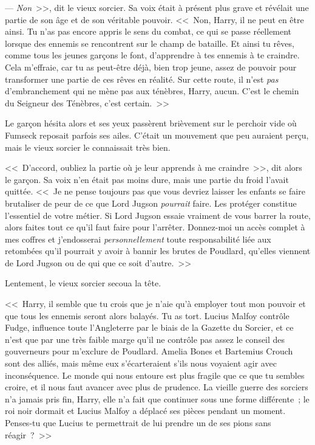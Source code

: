 --- \emph{Non}~>>, dit le vieux sorcier. Sa voix était à présent plus grave et révélait une partie de son âge et de son véritable pouvoir. <<~Non, Harry, il ne peut en être ainsi. Tu n'as pas encore appris le sens du combat, ce qui se passe réellement lorsque des ennemis se rencontrent sur le champ de bataille. Et ainsi tu rêves, comme tous les jeunes garçons le font, d'apprendre à tes ennemis à te craindre. Cela m'effraie, car tu as peut-être déjà, bien trop jeune, assez de pouvoir pour transformer une partie de ces rêves en réalité. Sur cette route, il n'est \emph{pas} d'embranchement qui ne mène pas aux ténèbres, Harry, aucun. C'est le chemin du Seigneur des Ténèbres, c'est certain.~>>

Le garçon hésita alors et ses yeux passèrent brièvement sur le perchoir vide où Fumseck reposait parfois ses ailes. C'était un mouvement que peu auraient perçu, mais le vieux sorcier le connaissait très bien.

<<~D'accord, oubliez la partie où je leur apprends à me craindre~>>, dit alors le garçon. Sa voix n'en était pas moins dure, mais une partie du froid l'avait quittée. <<~Je ne pense toujours pas que vous devriez laisser les enfants se faire brutaliser de peur de ce que Lord Jugson \emph{pourrait} faire. Les protéger constitue l'essentiel de votre métier. Si Lord Jugson essaie vraiment de vous barrer la route, alors faites tout ce qu'il faut faire pour l'arrêter. Donnez-moi un accès complet à mes coffres et j'endosserai \emph{personnellement} toute responsabilité liée aux retombées qu'il pourrait y avoir à bannir les brutes de Poudlard, qu'elles viennent de Lord Jugson ou de qui que ce soit d'autre.~>>

Lentement, le vieux sorcier secoua la tête.

<<~Harry, il semble que tu crois que je n'aie qu'à employer tout mon pouvoir et que tous les ennemis seront alors balayés. Tu as tort. Lucius Malfoy contrôle Fudge, influence toute l'Angleterre par le biais de la Gazette du Sorcier, et ce n'est que par une très faible marge qu'il ne contrôle pas assez le conseil des gouverneurs pour m'exclure de Poudlard. Amelia Bones et Bartemius Crouch sont des alliés, mais même eux s'écarteraient s'ils nous voyaient agir avec inconséquence. Le monde qui nous entoure est plus fragile que ce que tu sembles croire, et il nous faut avancer avec plus de prudence. La vieille guerre des sorciers n'a jamais pris fin, Harry, elle n'a fait que continuer sous une forme différente~; le roi noir dormait et Lucius Malfoy a déplacé ses pièces pendant un moment. Penses-tu que Lucius te permettrait de lui prendre un de ses pions sans réagir~?~>>

